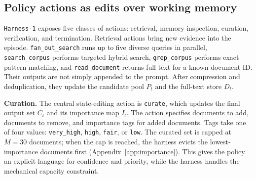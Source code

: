 \documentclass{article}
\newcommand{\sys}{\texttt{Harness-1}\xspace}
\newcommand{\wm}{\textsc{WorkingMemory}\xspace}
\newcommand{\curate}{\texttt{curate}\xspace}
\begin{document}


\subsection{Policy actions as edits over working memory}
\label{sec:method:action}

\sys exposes five classes of actions: retrieval, memory inspection, curation,
verification, and termination. Retrieval actions bring new evidence into the
episode. \texttt{fan\_out\_search} runs up to five diverse queries in parallel,
\texttt{search\_corpus} performs targeted hybrid search, \texttt{grep\_corpus}
performs exact pattern matching, and \texttt{read\_document} returns full text
for a known document ID. Their outputs are not simply appended to the prompt.
After compression and deduplication, they update the candidate pool $P_t$ and
the full-text store $D_t$.

\textbf{Curation.}
The central state-editing action is \curate, which updates the final output set
$C_t$ and its importance map $I_t$. The action specifies documents to add,
documents to remove, and importance tags for added documents. Tags take one of
four values: \texttt{very\_high}, \texttt{high}, \texttt{fair}, or
\texttt{low}. The curated set is capped at $M{=}30$ documents; when the cap is
reached, the harness evicts the lowest-importance documents first
(Appendix~\ref{app:importance}). This gives the policy an explicit language for
confidence and priority, while the harness handles the mechanical capacity
constraint.
\end{document}
